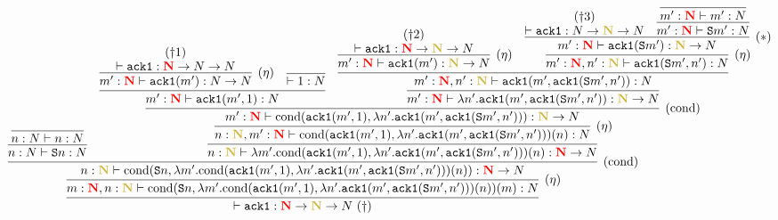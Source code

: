 \documentclass{article}
\newcommand{\bfColor}[2]{{\bf \color{#1}{#2}}}
\newcommand{\Reta}{\hbox{$(\eta)$}}
\newcommand{\Rcond}{\hbox{$(\text{cond})$}}
\newcommand{\AckA}{{\tt ack1}}
\newcommand{\Cond}[2]{\text{cond}(#1,#2)}
\newcommand{\Suc}[1]{{\tt S}#1}
\newcommand{\N}{N}
\newcommand{\gN}{\bfColor{oldgold}{N}}
\newcommand{\rN}{\bfColor{red}{N}}
\begin{document}
{\footnotesize
  \hspace{-3cm}
  $\infer{
    \vdash \AckA:\rN\to\gN\to\N\ (\dagger)
  }{
    \infer[\Reta]{
      m:\rN, n:\gN \vdash \Cond{\Suc{n}}{\lambda m'.\Cond{\AckA(m',1)}{\lambda n'.\AckA(m',\AckA(\Suc{m'},n'))}(n)}(m): \N
    }{
      \infer[\Rcond]{
        n:\gN \vdash \Cond{\Suc{n}}{\lambda m'.\Cond{\AckA(m',1)}{\lambda n'.\AckA(m',\AckA(\Suc{m'},n'))}(n)}: \rN\to\N
      }{
        \infer{
          n:\N \vdash \Suc{n}: \N
        }{
          \infer{
            n:\N \vdash n: \N
          }{}
        }
        &
        \infer{
          n:\gN \vdash \lambda m'.\Cond{\AckA(m',1)}{\lambda n'.\AckA(m',\AckA(\Suc{m'},n'))}(n): \rN\to\N
        }{
          \infer[\Reta]{
            n:\gN, m':\rN \vdash \Cond{\AckA(m',1)}{\lambda n'.\AckA(m',\AckA(\Suc{m'},n'))}(n): \N
          }{
            \infer[\Rcond]{
              m':\rN \vdash \Cond{\AckA(m',1)}{\lambda n'.\AckA(m',\AckA(\Suc{m'},n'))}: \gN\to\N
            }{
              \infer{
                m':\rN \vdash \AckA(m',1):\N
              }{
                \infer[\Reta]{
                  m':\rN \vdash \AckA(m'):\N\to\N
                }{
                  \deduce{
                    \vdash \AckA:\rN\to\N\to\N
                  }{(\dagger1)}
                }
                &
                \infer{
                  \vdash 1:\N
                }{}
              }
              &
              \infer{
                m':\rN \vdash \lambda n'.\AckA(m',\AckA(\Suc{m'},n')): \gN\to\N
              }{
                \infer{
                  m':\rN, n':\gN \vdash \AckA(m',\AckA(\Suc{m'},n')): \N
                }{
                  \infer[\Reta]{
                    m':\rN \vdash \AckA(m'): \gN\to\N
                  }{
                    \deduce{
                      \vdash \AckA: \rN\to\gN\to\N
                    }{(\dagger2)}
                  }
                  &
                  \infer[\Reta]{
                    m':\rN, n':\gN \vdash \AckA(\Suc{m'},n'): \N
                  }{
                    \infer[(*)]{
                      m':\rN \vdash \AckA(\Suc{m'}): \gN\to\N
                    }{
                      \deduce{
                        \vdash \AckA:\N\to\gN\to\N
                      }{
                        (\dagger3)
                      }
                      &
                      \infer{
                        m':\rN \vdash \Suc{m'}:\N
                      }{
                        \infer{
                          m':\rN \vdash m':\N
                        }{}
                      }
                    }
                  }
                }
              }
            }
          }
        }
      }
    }
  }$  
}
\end{document}
